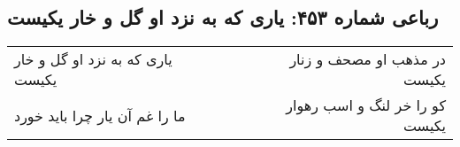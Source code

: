 \begin{center}
\section*{رباعی شماره ۴۵۳: یاری که به نزد او گل و خار یکیست}
\label{sec:0453}
\begin{longtable}{l p{0.5cm} r}
یاری که به نزد او گل و خار یکیست
&&
در مذهب او مصحف و زنار یکیست
\\
ما را غم آن یار چرا باید خورد
&&
کو را خر لنگ و اسب رهوار یکیست
\\
\end{longtable}
\end{center}
